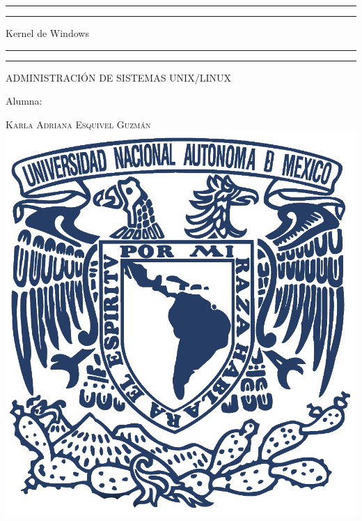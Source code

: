 \documentclass[a4paper, 11pt, oneside]{article}
\begin{document}
 

\begin{titlepage} 

	\centering 
	
	\scshape 
	
	\vspace*{\baselineskip} 
	
	
	
	\rule{\textwidth}{1.6pt}\vspace*{-\baselineskip}\vspace*{2pt} 
	\rule{\textwidth}{0.4pt} 
	
	\vspace{0.75\baselineskip} 
	
	{\LARGE Kernel de Windows}	
	\vspace{0.75\baselineskip} 
	
	\rule{\textwidth}{0.4pt}\vspace*{-\baselineskip}\vspace{3.2pt}
	\rule{\textwidth}{1.6pt} 
	
	\vspace{2\baselineskip} 
	

	ADMINISTRACIÓN DE SISTEMAS UNIX/LINUX
	
	\vspace*{3\baselineskip} 
	
	
	
	Alumna:
	
	\vspace{0.5\baselineskip} 
	
	{\scshape\Large Karla Adriana Esquivel Guzmán \\} 
	\vspace{0.5\baselineskip} 
	\vfill
	\includegraphics{unam.jpg}
	

\end{titlepage}
\end{document}
